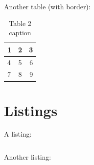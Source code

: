 Another table (with border):
\begin{table}[H]
    \centering
    \begin{tabular}{ | l | c | r | }\hline
        1 & 2 & 3 \\\hline
        4 & 5 & 6 \\\hline
        7 & 8 & 9 \\\hline
    \end{tabular}
    \caption{Table 2 caption}\label{tables_table2}
\end{table}

\section{Listings}

A listing:
\begin{code}
    \inputminted{yaml}{other/listings/examples/SimpleDockerCompose.yml}
\end{code}

Another listing:
\begin{code}
    \inputminted{bash}{other/listings/SimplePythonScript.sh}
\end{code}
